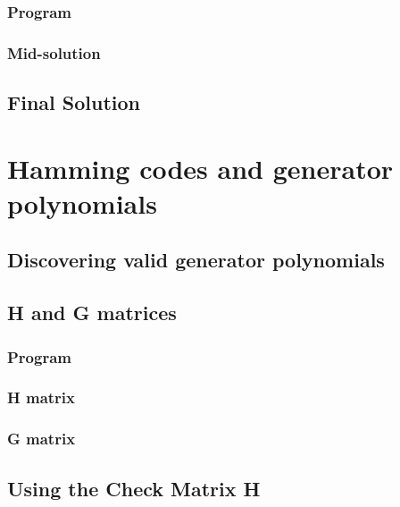 \documentclass[pdftex, 11pt, a4paper]{article}
\begin{document}
\subsubsection{Program}\label{last-byte}

\pagebreak

\subsubsection{Mid-solution}\label{last-byte-out}

\subsection{Final Solution}\label{q1-solution}
\pagebreak

\section{Hamming codes and generator polynomials}
\subsection{Discovering valid generator polynomials}\label{hammgen}

\pagebreak

\subsection{H and G matrices}
\subsubsection{Program}\label{hammgen-hg}

\subsubsection{H matrix}\label{h-matrix}
\subsubsection{G matrix}\label{g-matrix}
\pagebreak

\subsection{Using the Check Matrix H}\label{check-matrix}

\pagebreak
\end{document}
